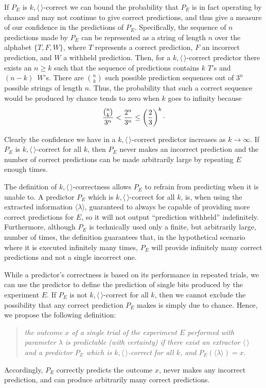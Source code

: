 \documentclass[%
 superscriptaddress,
 preprint,
 showpacs,
 showkeys,
 preprintnumbers,
  amsmath,amssymb,
  aps,
 pra,
  longbibliography,
  floatfix,
 ]{revtex4-1}
\theoremstyle{definition}
\newcommand{\rb}{\raisebox{0.5ex}}
\begin{document}
If $P_E$ is $k,\langle \, \rangle$-correct we can bound the probability that $P_E$ is in fact operating by chance and may not continue to give correct predictions, and thus give a measure of our confidence in the predictions of $P_E$.
Specifically, the sequence of $n$ predictions made by $P_E$ can be represented as a string of length $n$ over the alphabet $\{T,F,W\}$, where $T$ represents a correct prediction, $F$ an incorrect prediction, and $W$ a withheld prediction.
Then, for a $k,\langle \, \rangle$-correct predictor there exists an $n\ge k$ such that the sequence of predictions contains $k$ $T$'s and $(n-k)\,$ $W$'s.
There are ${n \choose k}$ such possible prediction sequences out of $3^n$ possible strings of length $n$.
Thus, the probability that such a correct sequence would be produced by chance tends to zero when $k$ goes to infinity because
$$\frac{{n\choose k}}{3^n}<\frac{2^n}{3^n}\le \left(\frac{2}{3}\right)^k\rb.$$

Clearly the confidence we have in a $k,\langle \, \rangle$-correct predictor increases as $k\to\infty$.
If $P_E$ is $k,\langle \, \rangle$-correct for all $k$, then $P_E$ never makes an incorrect prediction and the number of correct predictions can be made arbitrarily large by repeating $E$ enough times.

The definition of $k,\langle \, \rangle$-correctness allows $P_E$ to refrain from predicting when it is unable to.
A predictor $P_E$ which is $k,\langle \, \rangle$-correct for all $k$,  is, when using the extracted information $\langle\lambda\rangle$, guaranteed to always be capable of providing more correct predictions for $E$,
so it will not output ``prediction withheld'' indefinitely.
Furthermore, although $P_E$ is technically used only a finite, but arbitrarily large, number of times, the definition guarantees that, in the hypothetical scenario where it is executed infinitely many times, $P_E$ will provide  infinitely many correct predictions and not a single incorrect one.

While a predictor's correctness is based on its performance in repeated trials,  we can use the predictor to define the prediction of single bits produced by the experiment $E$.
If $P_E$ is not $k,\langle \, \rangle$-correct for all $k$, then we cannot exclude the possibility that any correct prediction $P_E$ makes is simply due to chance.
Hence, we propose the following definition: \\[-4.8ex]
\begin{quote}
\emph{the outcome $x$ of a single trial of the experiment $E$ performed with parameter $\lambda$ is {\rm predictable} (with certainty) if there exist an extractor $\langle \, \rangle$ and a predictor $P_E$ which is $k,\langle \, \rangle$-correct for all $k$, and $P_E(\langle\lambda\rangle)=x$}.\\[-4.8ex]
\end{quote}
Accordingly, $P_{E}$ correctly predicts the outcome $x$, never makes any incorrect  prediction, and can produce arbitrarily many correct predictions.
\end{document}

